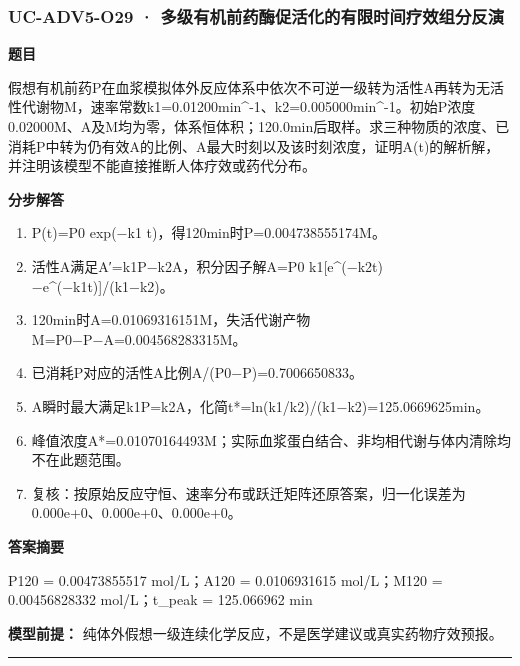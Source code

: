\documentclass[UTF8,11pt,a4paper]{ctexart}
\begin{document}
\subsubsection*{UC-ADV5-O29 · 多级有机前药酶促活化的有限时间疗效组分反演}
\noindent\textbf{题目}\par
假想有机前药P在血浆模拟体外反应体系中依次不可逆一级转为活性A再转为无活性代谢物M，速率常数k1=0.01200min\textasciicircum{}-1、k2=0.005000min\textasciicircum{}-1。初始P浓度0.02000M、A及M均为零，体系恒体积；120.0min后取样。求三种物质的浓度、已消耗P中转为仍有效A的比例、A最大时刻以及该时刻浓度，证明A(t)的解析解，并注明该模型不能直接推断人体疗效或药代分布。\par
\medskip\noindent\textbf{分步解答}
\begin{enumerate}
\item P(t)=P0 exp(−k1 t)，得120min时P=0.004738555174M。
\item 活性A满足A′=k1P−k2A，积分因子解A=P0 k1[e\textasciicircum{}(−k2t)−e\textasciicircum{}(−k1t)]/(k1−k2)。
\item 120min时A=0.01069316151M，失活代谢产物M=P0−P−A=0.004568283315M。
\item 已消耗P对应的活性A比例A/(P0−P)=0.7006650833。
\item A瞬时最大满足k1P=k2A，化简t*=ln(k1/k2)/(k1−k2)=125.0669625min。
\item 峰值浓度A*=0.01070164493M；实际血浆蛋白结合、非均相代谢与体内清除均不在此题范围。
\item 复核：按原始反应守恒、速率分布或跃迁矩阵还原答案，归一化误差为0.000e+0、0.000e+0、0.000e+0。
\end{enumerate}
\noindent\textbf{答案摘要}\par
P120 = 0.00473855517 mol/L；A120 = 0.0106931615 mol/L；M120 = 0.00456828332 mol/L；t\_peak = 125.066962 min\par
\noindent\textbf{模型前提：}
纯体外假想一级连续化学反应，不是医学建议或真实药物疗效预报。\par
\medskip\hrule\medskip
{}
\end{document}
